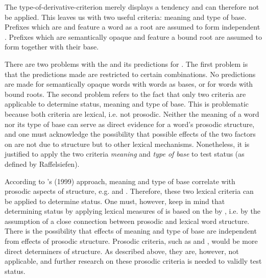 The type-of-derivative-criterion merely displays a tendency and can therefore not be applied. 
This leaves us with two useful criteria: meaning and type of base. Prefixes which are  and feature a word as a root are assumed to form independent . Prefixes which are semantically opaque and feature a bound root are assumed to form  together with their base.\largerpage 

There are two problems with the  and its predictions for . 
The first problem is that the predictions made are restricted to certain combinations. No predictions are made for semantically opaque words with words as bases, or for  words with bound roots. 
The second problem refers to the fact that only two criteria are applicable to determine  status, meaning and type of base. This is problematic because both criteria are lexical, i.e. not prosodic. Neither the meaning of a word nor its type of base can serve as direct evidence for a word's prosodic structure, and one must acknowledge the possibility that possible effects of the two factors on  are not due to  structure but to other lexical mechanisms. 
Nonetheless, it is justified to apply the two criteria \textit{meaning} and \textit{type of base} to test  status (as defined by Raffelsiefen). 

According to  \citeauthor{Raffelsiefen.1999}'s (1999) approach, meaning and type of base correlate with prosodic aspects of  structure, e.g.  and . Therefore, these two lexical criteria can be applied to determine  status. 
One must, however, keep in mind that determining  status by applying lexical measures of  is based on the  by \cite{Raffelsiefen.1999}, i.e. by the assumption of a close connection between prosodic and lexical word structure. There is the possibility that effects of meaning and type of base are independent from effects of prosodic structure. Prosodic criteria, such as  and , would be more direct determiners of  structure. As described above, they are, however, not applicable, and further research on these prosodic criteria is needed to validly test  status.\pagebreak


